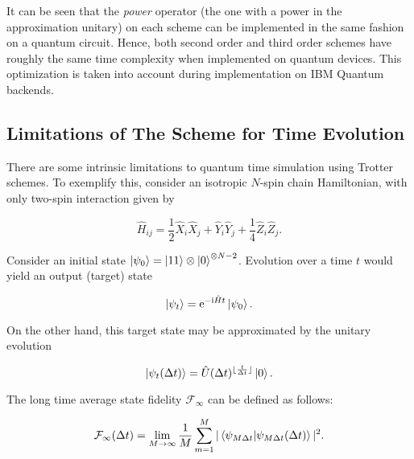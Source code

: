   It can be seen that the \textit{power} operator (the one with a power in the approximation unitary) on each scheme can be implemented in the same fashion on a quantum circuit. Hence, both second order and third order schemes have roughly the same time complexity when implemented on quantum devices. This optimization is taken into account during implementation on IBM Quantum backends.
  
  

  \subsection{Limitations of The Scheme for Time Evolution}
  \label{subsec:TrotterDynamics}

    There are some intrinsic limitations to quantum time simulation using Trotter schemes. To exemplify this, consider an isotropic $N$-spin chain Hamiltonian, with only two-spin interaction given by

    \begin{equation}
      \hat{H}_{ij} = \frac{1}{2} \hat{X}_i \hat{X}_j + \hat{Y}_i \hat{Y}_j + \frac{1}{4} \hat{Z}_i \hat{Z}_j.
      \label{eq:FloquetHamiltonian}
    \end{equation}

    Consider an initial state $\ket{\psi_0} = \ket{11} \otimes \ket{0}^{\otimes N-2}$. Evolution over a time $t$ would yield an output (target) state

    \begin{equation}
      \ket{\psi_t} = \mathrm{e}^{-\mathrm{i}\hat{H}t} \ket{\psi_0}
      \label{eq:TargetState}.
    \end{equation}

    On the other hand, this target state may be approximated by the unitary evolution

    \begin{equation}
      \ket{\psi_t(\Delta t)} = \hat{U}(\Delta t)^{\lfloor \frac{t}{\Delta t} \rfloor} \ket{0}.
      \label{eq:ApproxTargetState}
    \end{equation}

    The long time average state fidelity $\mathcal{F}_\infty$ can be defined as follows:

    \begin{equation}
      \mathcal{F}_\infty(\Delta t) = \lim_{M \rightarrow \infty} \frac{1}{M} \sum_{m = 1}^{M} |\braket{\psi_{M\Delta t}}{\psi_{M\Delta t}(\Delta t)}|^2.
    \end{equation}

